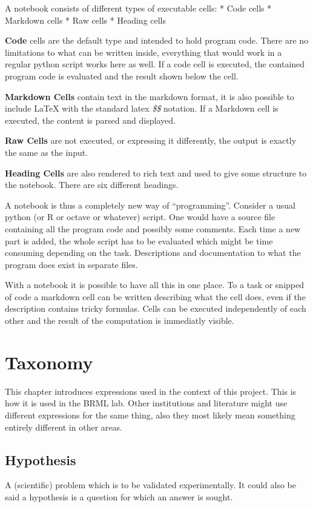 \documentclass[letterpaper,10pt,english]{sphinxmanual}
\begin{document}
A notebook consists of different types of executable cells:
* Code cells
* Markdown cells
* Raw cells
* Heading cells

\textbf{Code} cells are the default type and intended to hold program code. There are no
limitations to what can be written inside, everything that would work in a
regular python script works here as well. If a code cell is executed, the
contained program code is evaluated and the result shown below the cell.

\textbf{Markdown Cells} contain text in the markdown format, it is also possible to
include LaTeX with the standard latex \emph{\$\$} notation. If a Markdown cell is
executed, the content is parsed and displayed.

\textbf{Raw Cells} are not executed, or expressing it differently, the output is
exactly the same as the input.

\textbf{Heading Cells} are also rendered to rich text and used to give some
structure to the notebook. There are six different headings.

A notebook is thus a completely new way of ``programming''. Consider a usual
python (or R or octave or whatever) script. One would have a source file
containing all the program code and possibly some comments. Each time a new
part is added, the whole script has to be evaluated which might be time
consuming depending on the task. Descriptions and documentation to what the
program does exist in separate files.

With a notebook it is possible to have all this in one place. To a task or
snipped of code a markdown cell can be written describing what the cell does,
even if the description contains tricky formulas. Cells can be executed
independently of each other and the result of the computation is immediatly
visible.


\chapter{Taxonomy}
\label{taxonomy:taxonomy}\label{taxonomy::doc}
This chapter introduces expressions used in the context of this project. This
is how it is used in the BRML lab. Other institutions and literature might use
different expressions for the same thing, also they most likely mean something
entirely different in other areas.


\section{Hypothesis}
\label{taxonomy:hypothesis}
A (scientific) problem which is to be validated experimentally. It could also be
said a hypothesis is a question for which an answer is sought.
\end{document}
